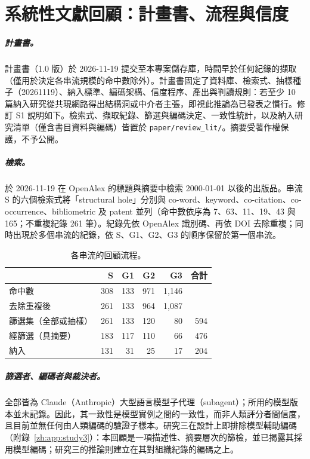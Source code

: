 \chapter{系統性文獻回顧：計畫書、流程與信度}
\label{zh:app:review}

\paragraph{計畫書。} 計畫書（1.0 版）於 2026-11-19 提交至本專案儲存庫，時間早於任何紀錄的擷取（僅用於決定各串流規模的命中數除外）。計畫書固定了資料庫、檢索式、抽樣種子（20261119）、納入標準、編碼架構、信度程序、產出與判讀規則：若至少 10 篇納入研究從共現網路得出結構洞或中介者主張，即視此推論為已發表之慣行。修訂 S1 說明如下。檢索式、擷取紀錄、篩選與編碼決定、一致性統計，以及納入研究清單（僅含書目資料與編碼）皆置於 \texttt{paper/review\_lit/}。摘要受著作權保護，不予公開。

\paragraph{檢索。} 於 2026-11-19 在 OpenAlex 的標題與摘要中檢索 2000-01-01 以後的出版品。串流 S 的六個檢索式將「structural hole」分別與 co-word、keyword、co-citation、co-occurrence、bibliometric 及 patent 並列（命中數依序為 7、63、11、19、43 與 165；不重複紀錄 261 筆）。紀錄先依 OpenAlex 識別碼、再依 DOI 去除重複；同時出現於多個串流的紀錄，依 S、G1、G2、G3 的順序保留於第一個串流。

\begin{table}[htbp]
  \centering
  \caption{各串流的回顧流程。}
  \label{zh:tab:app_review_flow}
  \small
  \begin{tabular}{lrrrrr}
    \toprule
    & S & G1 & G2 & G3 & 合計 \\
    \midrule
    命中數 & 308 & 133 & 971 & 1,146 & \\
    去除重複後 & 261 & 133 & 964 & 1,087 & \\
    篩選集（全部或抽樣） & 261 & 133 & 120 & 80 & 594 \\
    經篩選（具摘要） & 183 & 117 & 110 & 66 & 476 \\
    納入 & 131 & 31 & 25 & 17 & 204 \\
    \bottomrule
  \end{tabular}
\end{table}

\paragraph{篩選者、編碼者與裁決者。} 全部皆為 Claude（Anthropic）大型語言模型子代理（subagent）；所用的模型版本並未記錄。因此，其一致性是模型實例之間的一致性，而非人類評分者間信度，且目前並無任何由人類編碼的驗證子樣本。研究三在設計上即排除模型輔助編碼（附錄~\ref{zh:app:study3}）：本回顧是一項描述性、摘要層次的篩檢，並已揭露其採用模型編碼；研究三的推論則建立在其對組織紀錄的編碼之上。

